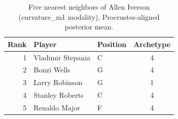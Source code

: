 \begin{table}[htbp]
  \centering\small
  \begin{tabular}{rllc}
    \toprule
    Rank & Player & Position & Archetype \\
    \midrule
    1 & Vladimir Stepania & C & 4 \\
    2 & Bonzi Wells & G & 4 \\
    3 & Larry Robinson & G & 1 \\
    4 & Stanley Roberts & C & 4 \\
    5 & Renaldo Major & F & 4 \\
    \bottomrule
  \end{tabular}
  \caption{Five nearest neighbors of Allen Iverson (curvature_m1 modality), Procrustes-aligned posterior mean.}
  \label{tab:Allen_Iverson_neighbors_curvature_m1}
\end{table}

